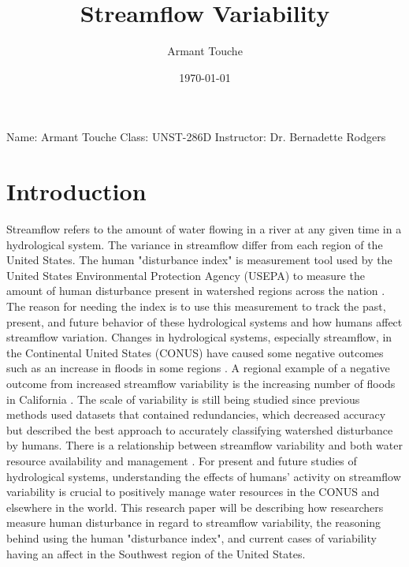 \documentclass[a4paper,man,biblatex]{apa7}
\title{Streamflow Variability}
\author{Armant Touche}
\affiliation{Portland State University}
\date{\today}
\begin{document}
\noindent Name: Armant Touche\newline
\noindent Class: UNST-286D\newline
\noindent Instructor: Dr. Bernadette Rodgers\newline
\section{Introduction} 
\par  Streamflow refers to the amount of water flowing in a river at any given time \autocite{streamflow_def} in a hydrological system. The variance in streamflow differ from each region of the United States. The human "disturbance index" is measurement tool used by the United States Environmental Protection Agency (USEPA) to measure the amount of human disturbance present in watershed regions across the nation \autocite{falcone_2016}. The reason for needing the index is to use this measurement to track the past, present, and future behavior of these hydrological systems and how humans affect streamflow variation. Changes in hydrological systems, especially streamflow, in the Continental United States (CONUS) have caused some negative outcomes such as an increase in floods in some regions \autocite{rice_2016}. A regional example of a negative outcome from increased streamflow variability is the increasing number of floods in California \autocite{standford_2020}. The scale of variability is still being studied since previous methods used datasets that contained redundancies, which decreased accuracy but \textcite{falcone_2016} described the best approach to accurately classifying watershed disturbance by humans. There is a relationship between streamflow variability and both water resource availability and management \autocite{rice_2016}. For present and future studies of hydrological systems, understanding the effects of humans' activity on streamflow variability is crucial to positively manage water resources in the CONUS and elsewhere in the world. This research paper will be describing how researchers measure human disturbance in regard to streamflow variability, the reasoning behind  using the human "disturbance index", and current cases of variability having an affect in the Southwest region of the United States.\\
\end{document}
